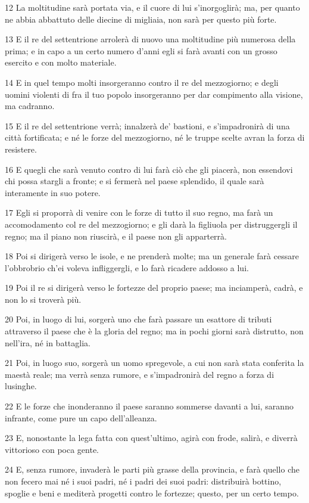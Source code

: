 \par 12 La moltitudine sarà portata via, e il cuore di lui s'inorgoglirà; ma, per quanto ne abbia abbattuto delle diecine di migliaia, non sarà per questo più forte.
\par 13 E il re del settentrione arrolerà di nuovo una moltitudine più numerosa della prima; e in capo a un certo numero d'anni egli si farà avanti con un grosso esercito e con molto materiale.
\par 14 E in quel tempo molti insorgeranno contro il re del mezzogiorno; e degli uomini violenti di fra il tuo popolo insorgeranno per dar compimento alla visione, ma cadranno.
\par 15 E il re del settentrione verrà; innalzerà de' bastioni, e s'impadronirà di una città fortificata; e né le forze del mezzogiorno, né le truppe scelte avran la forza di resistere.
\par 16 E quegli che sarà venuto contro di lui farà ciò che gli piacerà, non essendovi chi possa stargli a fronte; e si fermerà nel paese splendido, il quale sarà interamente in suo potere.
\par 17 Egli si proporrà di venire con le forze di tutto il suo regno, ma farà un accomodamento col re del mezzogiorno; e gli darà la figliuola per distruggergli il regno; ma il piano non riuscirà, e il paese non gli apparterrà.
\par 18 Poi si dirigerà verso le isole, e ne prenderà molte; ma un generale farà cessare l'obbrobrio ch'ei voleva infliggergli, e lo farà ricadere addosso a lui.
\par 19 Poi il re si dirigerà verso le fortezze del proprio paese; ma inciamperà, cadrà, e non lo si troverà più.
\par 20 Poi, in luogo di lui, sorgerà uno che farà passare un esattore di tributi attraverso il paese che è la gloria del regno; ma in pochi giorni sarà distrutto, non nell'ira, né in battaglia.
\par 21 Poi, in luogo suo, sorgerà un uomo spregevole, a cui non sarà stata conferita la maestà reale; ma verrà senza rumore, e s'impadronirà del regno a forza di lusinghe.
\par 22 E le forze che inonderanno il paese saranno sommerse davanti a lui, saranno infrante, come pure un capo dell'alleanza.
\par 23 E, nonostante la lega fatta con quest'ultimo, agirà con frode, salirà, e diverrà vittorioso con poca gente.
\par 24 E, senza rumore, invaderà le parti più grasse della provincia, e farà quello che non fecero mai né i suoi padri, né i padri dei suoi padri: distribuirà bottino, spoglie e beni e mediterà progetti contro le fortezze; questo, per un certo tempo.
